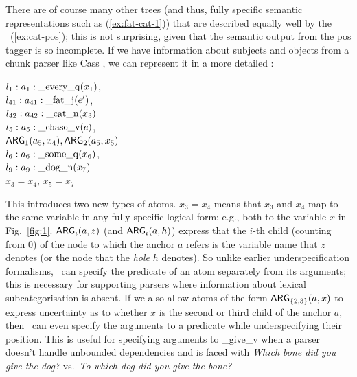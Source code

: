
There are of course many other trees (and thus, fully specific
semantic representations such as (\ref{ex:fat-cat-1})) that are
described equally well by the \rmrs\ (\ref{ex:cat-pos}); this is not
surprising, given that the semantic output from the {\sc
  pos} tagger is so incomplete.  If we have
information about subjects and objects from a chunk parser
like Cass \cite{abney:1996}, we can represent it in a more detailed
\rmrs:

\begin{examples}
\item 
$l_1:a_1:\mathrm{\_every\_q}(x_1)$, \\
$l_{41}:a_{41}:\mathrm{\_fat\_j}(e')$,\\
$l_{42}:a_{42}:\mathrm{\_cat\_n}(x_3)$\\
$l_5:a_5:\mathrm{\_chase\_v}(e)$, \\
\hspace*{0.1in} $\mathsf{ARG}_1(a_5,x_4),
\mathsf{ARG}_2(a_5,x_5)$\\ 
$l_6:a_6:\mathrm{\_some\_q}(x_6)$, \\
$l_9:a_9:\mathrm{\_dog\_n}(x_7)$\\
$x_3=x_4$, $x_5=x_7$
\label{ex:cat-partial-parser}
\end{examples}

This introduces two new types of atoms.   $x_3=x_4$
means that $x_3$ and $x_4$ map to the same
variable in any fully specific logical form; e.g., both to the
variable $x$ in Fig.~\ref{fig:1}.   $\mathsf{ARG}_i(a,z)$ (and
$\mathsf{ARG}_i(a,h)$) express that the $i$-th child (counting from 0) of the
node to which the anchor $a$ refers is the variable name that $z$
denotes (or the node that the {\em hole} $h$ denotes).  So unlike
earlier underspecification formalisms, \rmrs\ can specify the
predicate of an atom separately from its
arguments; this is necessary for supporting parsers where information
about lexical subcategorisation is absent. If we also allow atoms of
the form $\mathsf{ARG}_{\{2,3\}}(a,x)$ to express uncertainty as to whether
$x$ is the second or third child of the anchor $a$, then \rmrs\ can
even specify the arguments to a predicate while underspecifying their
position.  This is useful for specifying arguments to \_give\_v when a
parser doesn't handle unbounded dependencies and is faced with
{\em Which bone did you give the dog?} vs.\ {\em To which dog did you
  give the bone?}

